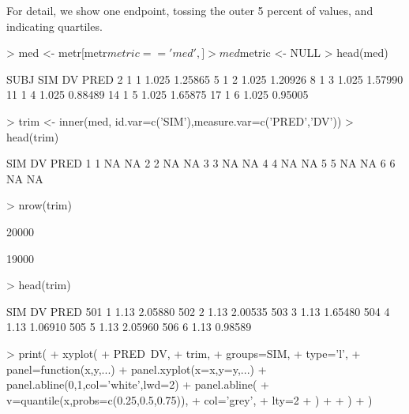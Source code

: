 For detail, we show one endpoint, tossing the outer 5 percent of values, and 
indicating quartiles.
\begin{Schunk}
\begin{Sinput}
> med <- metr[metr$metric=='med',]
> med$metric <- NULL
> head(med)
\end{Sinput}
\begin{Soutput}
   SUBJ SIM    DV    PRED
2     1   1 1.025 1.25865
5     1   2 1.025 1.20926
8     1   3 1.025 1.57990
11    1   4 1.025 0.88489
14    1   5 1.025 1.65875
17    1   6 1.025 0.95005
\end{Soutput}
\begin{Sinput}
> trim <- inner(med, id.var=c('SIM'),measure.var=c('PRED','DV'))
> head(trim)
\end{Sinput}
\begin{Soutput}
  SIM DV PRED
1   1 NA   NA
2   2 NA   NA
3   3 NA   NA
4   4 NA   NA
5   5 NA   NA
6   6 NA   NA
\end{Soutput}
\begin{Sinput}
> nrow(trim)
\end{Sinput}
\begin{Soutput}
[1] 20000
\end{Soutput}
\begin{Soutput}
[1] 19000
\end{Soutput}
\begin{Sinput}
> head(trim)
\end{Sinput}
\begin{Soutput}
    SIM   DV    PRED
501   1 1.13 2.05880
502   2 1.13 2.00535
503   3 1.13 1.65480
504   4 1.13 1.06910
505   5 1.13 2.05960
506   6 1.13 0.98589
\end{Soutput}
\begin{Sinput}
> print(
+ 	xyplot(
+ 		PRED~DV,
+ 		trim,
+ 		groups=SIM,
+ 		type='l',
+ 		panel=function(x,y,...){
+ 			panel.xyplot(x=x,y=y,...)
+ 			panel.abline(0,1,col='white',lwd=2)
+ 			panel.abline(
+ 				v=quantile(x,probs=c(0.25,0.5,0.75)),
+ 				col='grey',
+ 				lty=2
+ 			)
+ 		}
+ 	)
+ )
\end{Sinput}
\end{Schunk}
